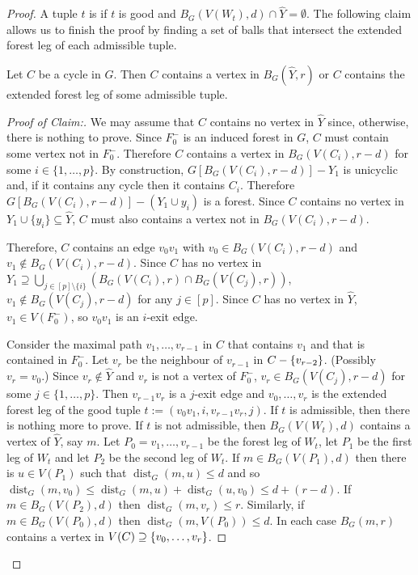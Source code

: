 \documentclass{patmorin}
\newcommand{\pat}[1]{\textcolor{Blue}{[Pat: #1]}}
\newcommand{\gwen}[1]{\textcolor{Purple}{Gwen: #1}}
\newenvironment{clmproof}{\begin{proof}[Proof of Claim:]\renewcommand{\qedsymbol}{\rule{1ex}{1ex}}}{\end{proof}}
\DeclareMathOperator{\dist}{dist}
\DeclarePairedDelimiter\set{\{}{\}}
\begin{document}
\begin{proof}
A tuple $t$ is  if $t$ is good and $B_G(V(W_t),d) \cap \widehat{Y} = \emptyset$.  The following claim 
allows us to finish the proof by finding a set of balls that intersect the extended forest leg of each admissible tuple.

\begin{clm}\label{hit_cycle}
  Let $C$ be a cycle in $G$.  Then  $C$ contains a vertex in $B_G(\widehat{Y},r)$ or $C$ contains the extended forest leg of some admissible tuple.
\end{clm}

\begin{clmproof}
  We may assume that $C$ contains no vertex in $\widehat{Y}$ since, otherwise, there is nothing to prove.
  Since $F_0^-$ is an induced forest in $G$, $C$ must contain some vertex not in $F_0^-$.  Therefore $C$ contains a vertex in $B_G(V(C_i),r-d)$  for some $i\in\{1,\ldots,p\}$. By construction, $G[B_G(V(C_i),r-d)]-Y_1$ is unicyclic and, if it contains any cycle then it contains $C_i$.  Therefore  $G[B_G(V(C_i),r-d)]-(Y_1\cup y_i)$ is a forest.  Since $C$ contains no vertex in $Y_1\cup\{y_i\}\subseteq \widehat{Y}$, $C$ must also contains a vertex not in $B_G(V(C_i),r-d)$.

  Therefore, $C$ contains an edge $v_0v_1$ with $v_0\in B_G(V(C_i),r-d)$ and $v_1\not\in B_G(V(C_i),r-d)$.  Since $C$ has no vertex in $Y_1\supseteq \bigcup_{j\in[p]\setminus\{i\}}(B_G(V(C_i),r)\cap B_G(V(C_j),r))$, $v_1\not\in B_G(V(C_j),r-d)$ for any $j\in[p]$. Since $C$ has no vertex in $\widehat{Y}$, $v_1\in V(F^-_0)$, so $v_0v_1$ is an $i$-exit edge.
  
  Consider the maximal path $v_1,\ldots,v_{r-1}$ in $C$ that contains $v_1$ and that is contained in $F_0^-$. Let $v_r$ be the neighbour of $v_{r-1}$ in $C-\set{v_{r-2}}$.  (Possibly $v_r=v_0$.)  Since $v_r\notin \widehat{Y}$ and $v_r$ is not a vertex of $F_0^-$, $v_r\in B_G(V(C_j),r-d)$ for some $j\in\{1,\ldots,p\}$.   Then $v_{r-1}v_r$ is a $j$-exit edge and $v_0,\ldots,v_{r}$ is the extended forest leg of the good tuple $t:=(v_0v_1,i,v_{r-1}v_r,j)$.   If $t$ is admissible, then there is nothing more to prove.  If $t$ is not admissible, 
  then $B_G(V(W_t),d)$ contains a vertex of $\widehat{Y}$, say $m$.  
  Let $P_0=v_1,\ldots,v_{r-1}$ be the forest leg of $W_t$, let $P_1$ be the first leg of $W_t$ and let $P_2$ be the second leg of $W_t$. 
  If $m\in B_G(V(P_1),d)$ then there is $u\in V(P_1)$ such that $\dist_G(m,u)\leq d$ and so 
  $\dist_G(m,v_0)\le \dist_G(m,u) + \dist_G(u,v_0)\le d + (r-d)$.  
  If $m\in B_G(V(P_2),d)$ then $\dist_G(m,v_r)\le r$.  Similarly, if $m\in B_G(V(P_0),d)$ then $\dist_G(m,V(P_0))\le d$.  In each case $B_G(m,r)$ contains a vertex in $V(C)\supseteq \set{v_0,\ldots,v_r}$.
\end{clmproof}


\end{proof}
\end{document}
